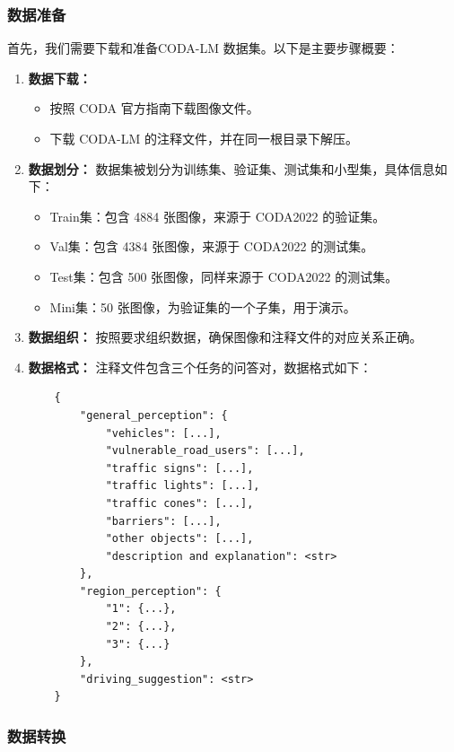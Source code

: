 \documentclass[
    linespread = 1.25
]{ctexart}
\begin{document}
\subsubsection{数据准备}
首先，我们需要下载和准备CODA-LM 数据集。以下是主要步骤概要：

\begin{enumerate}
  \item \textbf{数据下载：}
        \begin{itemize}
          \item 按照 CODA 官方指南下载图像文件。
          \item 下载 CODA-LM 的注释文件，并在同一根目录下解压。
        \end{itemize}

  \item \textbf{数据划分：} 数据集被划分为训练集、验证集、测试集和小型集，具体信息如下：
        \begin{itemize}
          \item Train集：包含 4884 张图像，来源于 CODA2022 的验证集。
          \item Val集：包含 4384 张图像，来源于 CODA2022 的测试集。
          \item Test集：包含 500 张图像，同样来源于 CODA2022 的测试集。
          \item Mini集：50 张图像，为验证集的一个子集，用于演示。
        \end{itemize}
  \item \textbf{数据组织：} 按照要求组织数据，确保图像和注释文件的对应关系正确。
  \item \textbf{数据格式：}
        注释文件包含三个任务的问答对，数据格式如下：
        \begin{verbatim}
    {
        "general_perception": {
            "vehicles": [...],
            "vulnerable_road_users": [...],
            "traffic signs": [...],
            "traffic lights": [...],
            "traffic cones": [...],
            "barriers": [...],
            "other objects": [...],
            "description and explanation": <str>
        },
        "region_perception": {
            "1": {...},
            "2": {...},
            "3": {...}
        },
        "driving_suggestion": <str>
    }
    \end{verbatim}
\end{enumerate}

\subsubsection{数据转换}
\end{document}
